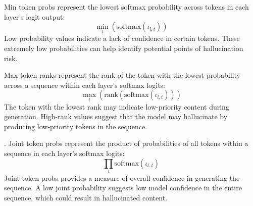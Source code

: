 Min token probs represent the lowest softmax probability across tokens in each layer's logit output:
\[
\min_{t} \left( \text{softmax}(\iota_{l, t}) \right)
\]
Low probability values indicate a lack of confidence in certain tokens. These extremely low probabilities can help identify potential points of hallucination risk.

Max token ranks represent the rank of the token with the lowest probability across a sequence within each layer’s softmax logits:
\[
\max_{t} \left( \text{rank}(\text{softmax}(\iota_{l, t})) \right)
\]
The token with the lowest rank may indicate low-priority content during generation. High-rank values suggest that the model may hallucinate by producing low-priority tokens in the sequence.

.
Joint token probs represent the product of probabilities of all tokens within a sequence in each layer’s softmax logits:
\[
\prod_{t} \text{softmax}(\iota_{l, t})
\]
Joint token probs provides a measure of overall confidence in generating the sequence. A low joint probability suggests low model confidence in the entire sequence, which could result in hallucinated content.

